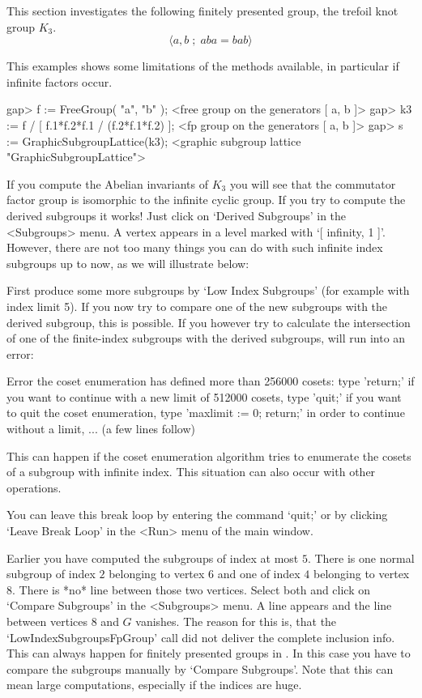 
This  section  investigates the  following  finitely presented group, the
trefoil knot group $K_3$.
$$
    \langle a, b \;;\; aba = bab \rangle
$$

This examples shows some  limitations   of the methods available,   in
particular if infinite factors occur.

\begintt
gap> f := FreeGroup( "a", "b" );
<free group on the generators [ a, b ]>
gap> k3 := f / [ f.1*f.2*f.1 / (f.2*f.1*f.2) ];
<fp group on the generators [ a, b ]>
gap> s := GraphicSubgroupLattice(k3);
<graphic subgroup lattice "GraphicSubgroupLattice">
\endtt

If you  compute the Abelian invariants of  $K_3$ you will see that the
commutator factor  group is isomorphic to the   infinite cyclic group. 
If you try to  compute the derived subgroups it  works!  Just click on
`Derived Subgroups'  in the <Subgroups> menu. A  vertex appears in a
level marked with `[  infinity, 1 ]'. However,  there are not too many
things you can do with such infinite index subgroups up  to now, as we
will illustrate below:

First  produce some  more  subgroups  by  `Low Index Subgroups' (for
example with index limit 5). If you now try to compare  one of the new
subgroups with the derived subgroup,  this is possible. If you however
try to calculate the intersection of one of the finite-index subgroups
with the derived subgroups, {\GAP} will run into an error:

\begintt
Error the coset enumeration has defined more than 256000 cosets:
type 'return;' if you want to continue with a new limit of 512000 cosets,
type 'quit;' if you want to quit the coset enumeration,
type 'maxlimit := 0; return;' in order to continue without a limit,
...   (a few lines follow)
\endtt

This can happen if the coset enumeration algorithm tries to enumerate
the cosets of a subgroup with infinite index.  This situation can also
occur with other operations. 

You can leave this break loop by entering the command `quit;' or by
clicking `Leave Break Loop' in the <Run> menu of the main {\XGAP}
window.

Earlier you have computed the subgroups of index at most $5$.  There
is one normal subgroup of index $2$ belonging to vertex $6$ and one of
index $4$ belonging to vertex $8$. There is *no* line between those
two vertices. Select both and click on `Compare Subgroups' in the
<Subgroups> menu. A line appears and the line between vertices $8$ and
$G$ vanishes. The reason for this is, that the
`LowIndexSubgroupsFpGroup' call did not deliver the complete inclusion
info. This can always happen for finitely presented groups in {\XGAP}.
In this case you have to compare the subgroups manually by 
`Compare Subgroups'. Note that this can mean large computations, especially if
the indices are huge.

